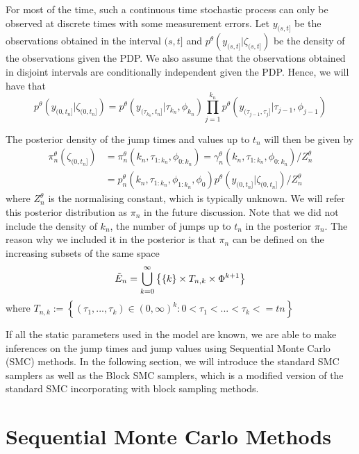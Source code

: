 \documentclass[12pt,a4paper]{article}
\begin{document}
For most of the time, such a continuous time stochastic process can only be observed at discrete times with some measurement errors. Let $y_{(s,t]}$ be the observations obtained in the interval $(s,t]$ and $p^{\theta}(y_{(s,t]}|\zeta_{(s,t]})$ be the density of the observations given the PDP. We also assume that the observations obtained in disjoint intervals are conditionally independent given the PDP. Hence, we will have that 
\begin{equation}
\label{eqn:Chap1-PDMP-Likelihood}
    p^{\theta}(y_{(0,t_n]}|\zeta_{(0,t_n]}) = p^{\theta}(y_{(\tau_{k_n},t_n]}|\tau_{k_n},\phi_{k_n}) \prod_{j=1}^{k_n} p^{\theta}(y_{(\tau_{j-1},\tau_j]}|\tau_{j-1},\phi_{j-1})
\end{equation}


The posterior density of the jump times and values up to $t_n$ will then be given by 
\begin{equation}
\label{eqn:Chap1-PDMP-Posterior}
	\begin{split}
		 \pi_n^{\theta}(\zeta_{(0,t_n]}) &= \pi_n^{\theta}(k_n,\tau_{1:k_n},\phi_{0:k_n}) = \gamma_{n}^{\theta}(k_n,\tau_{1:k_n},\phi_{0:k_n})/Z_n^{\theta}\\
		 &=p_n^{\theta}(k_n,\tau_{1:k_n},\phi_{1:k_n},\phi_0)  p^{\theta}(y_{(0,t_n]}|\zeta_{(0,t_n]}) / Z_n^{\theta}		
	\end{split} 
\end{equation}
where $Z_n^{\theta}$ is the normalising constant, which is typically unknown. We will refer this posterior distribution as $\pi_n$ in the future discussion. Note that we did not include the density of $k_n$, the number of jumps up to $t_n$ in the posterior $\pi_n$. The reason why we included it in the posterior is that $\pi_n$ can be defined on the increasing subsets of the same space 
\begin{equation*}
    \Tilde{E}_n = \bigcup_{k=0}^{\infty} \left\{\{k\}\times T_{n,k} \times \Phi^{k+1}\right\}
\end{equation*}
where $T_{n,k} := \left\{(\tau_1,...,\tau_k) \in (0,\infty)^k : 0 < \tau_1 <...< \tau_k <= tn\right\}$

If all the static parameters used in the model are known, we are able to make inferences on the jump times and jump values using Sequential Monte Carlo (SMC) methods. In the following section, we will introduce the standard SMC samplers as well as the Block SMC samplers, which is a modified version of the standard SMC incorporating with block sampling methods. 
\section{Sequential Monte Carlo Methods}
\end{document}
